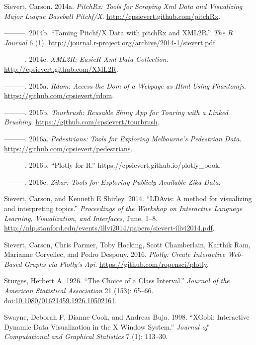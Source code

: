 \documentclass[12pt,]{isuthesis}
\begin{document}
\hypertarget{ref-pitchRx}{}
Sievert, Carson. 2014a. \emph{PitchRx: Tools for Scraping Xml Data and
Visualizing Major League Baseball Pitchf/X}.
\url{http://cpsievert.github.com/pitchRx}.

\hypertarget{ref-Sievert:2014a}{}
---------. 2014b. ``Taming Pitchf/X Data with pitchRx and XML2R.''
\emph{The R Journal} 6 (1).
\url{http://journal.r-project.org/archive/2014-1/sievert.pdf}.

\hypertarget{ref-XML2R}{}
---------. 2014c. \emph{XML2R: EasieR Xml Data Collection}.
\url{http://cpsievert.github.com/XML2R}.

\hypertarget{ref-rdom}{}
---------. 2015a. \emph{Rdom: Access the Dom of a Webpage as Html Using
Phantomjs}. \url{https://github.com/cpsievert/rdom}.

\hypertarget{ref-tourbrush}{}
---------. 2015b. \emph{Tourbrush: Reusable Shiny App for Touring with a
Linked Brushing}. \url{https://github.com/cpsievert/tourbrush}.

\hypertarget{ref-pedestrians}{}
---------. 2016a. \emph{Pedestrians: Tools for Exploring Melbourne's
Pedestrian Data}. \url{https://github.com/cpsievert/pedestrians}.

\hypertarget{ref-plotly-book}{}
---------. 2016b. ``Plotly for R.''
https://cpsievert.github.io/plotly\_book.

\hypertarget{ref-zikar}{}
---------. 2016c. \emph{Zikar: Tools for Exploring Publicly Available
Zika Data}.

\hypertarget{ref-Sievert:2014b}{}
Sievert, Carson, and Kenneth E Shirley. 2014. ``LDAvis: A method for
visualizing and interpreting topics.'' \emph{Proceedings of the Workshop
on Interactive Language Learning, Visualization, and Interfaces}, June,
1--8.
\url{http://nlp.stanford.edu/events/illvi2014/papers/sievert-illvi2014.pdf}.

\hypertarget{ref-plotly}{}
Sievert, Carson, Chris Parmer, Toby Hocking, Scott Chamberlain, Karthik
Ram, Marianne Corvellec, and Pedro Despouy. 2016. \emph{Plotly: Create
Interactive Web-Based Graphs via Plotly's Api}.
\url{https://github.com/ropensci/plotly}.

\hypertarget{ref-Sturges}{}
Sturges, Herbert A. 1926. ``The Choice of a Class Interval.''
\emph{Journal of the American Statistical Association} 21 (153): 65--66.
doi:\href{https://doi.org/10.1080/01621459.1926.10502161}{10.1080/01621459.1926.10502161}.

\hypertarget{ref-xgobi}{}
Swayne, Deborah F, Dianne Cook, and Andreas Buja. 1998. ``XGobi:
Interactive Dynamic Data Visualization in the X Window System.''
\emph{Journal of Computational and Graphical Statistics} 7 (1): 113--30.
\end{document}
